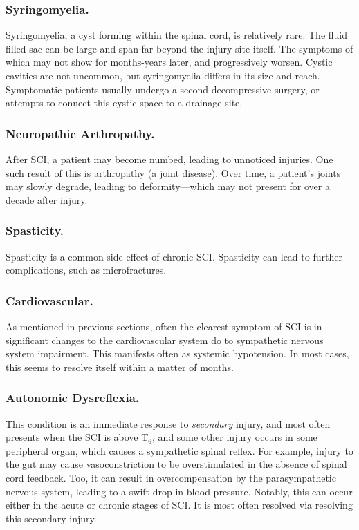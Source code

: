 \documentclass[12pt]{report}
\begin{document}
\subsubsection{Syringomyelia.}
Syringomyelia, a cyst forming within the spinal cord, is relatively rare. The fluid filled sac can be large and span far beyond the injury site itself. The symptoms of which may not show for months-years later, and progressively worsen. Cystic cavities are not uncommon, but syringomyelia differs in its size and reach. Symptomatic patients usually undergo a second decompressive surgery, or attempts to connect this cystic space to a drainage site. 

\subsubsection{Neuropathic Arthropathy.}
After SCI, a patient may become numbed, leading to unnoticed injuries. One such result of this is arthropathy (a joint disease). Over time, a patient's joints may slowly degrade, leading to deformity---which may not present for over a decade after injury. 

\subsubsection{Spasticity.}
Spasticity is a common side effect of chronic SCI. Spasticity can lead to further complications, such as microfractures. 

\subsubsection{Cardiovascular.}
As mentioned in previous sections, often the clearest symptom of SCI is in significant changes to the cardiovascular system do to sympathetic nervous system impairment. This manifests often as systemic hypotension. In most cases, this seems to resolve itself within a matter of months. 

\subsubsection{Autonomic Dysreflexia.}
This condition is an immediate response to \textit{secondary} injury, and most often presents when the SCI is above T$_6$, and some other injury occurs in some peripheral organ, which causes a sympathetic spinal reflex. For example, injury to the gut may cause vasoconstriction to be overstimulated in the absence of spinal cord feedback. Too, it can result in overcompensation by the parasympathetic nervous system, leading to a swift drop in blood pressure. Notably, this can occur either in the acute or chronic stages of SCI. It is most often resolved via resolving this secondary injury. 
\end{document}
